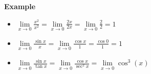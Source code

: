 \documentclass[12pt]{article}
\begin{document}
\newpage
{\bf Example}
\begin{itemize}
  \item $\lim\limits_{x\to 0} \frac{x^2}{x^2} = \lim\limits_{x\to 0} \frac{2x}{2x} = \lim\limits_{x\to 0} \frac{2}{2}=1$
  \item $\lim\limits_{x\to 0} \frac{\sin x}{x} = \lim\limits_{x\to 0} \frac{\cos x}{1} = \frac{\cos 0}{1} = 1$
  \item $\lim\limits_{x\to 0} \frac{\sin x}{\tan x} = \lim\limits_{x\to 0} \frac{\cos x}{\sec^2 x} = \lim\limits_{x\to 0}\cos^3 (x)$
\end{itemize}
\end{document}
